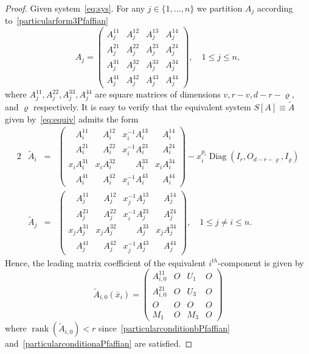 \documentclass[final,1p,times,number,amsthm]{elsart}
\begin{document}
\begin{proof}
  Given system~\eqref{eq:sys}. For any $j \in \{1, \dots, n\}$ we partition
  $A_{j}$ according to~\eqref{particularform3Pfaffian}
$$A_{j} = \left(\begin{matrix} A_{j}^{11}  & A_{j}^{12} & A_{j}^{13}&
    A_{j}^{14}\\[5pt] A_{j}^{21} & A_{j}^{22} & A_{j}^{23} & A_{j}^{24}\\[5pt]
    A_{j}^{31} & A_{j}^{32} & A_{j}^{33} & A_{j}^{34}\\[5pt] A_{j}^{41} &
    A_{j}^{42} & A_{j}^{43} & A_{j}^{44}\end{matrix}\right), \quad 1 \leq j \leq
n, $$
where $A_{j}^{11} , A_{j}^{22} , A_{j}^{33} , A_{j}^{44}$ are square matrices of
dimensions $v, r-v, d-r-\varrho,$ and $\varrho$ respectively.  It is easy to
verify that the equivalent system $S[A] \equiv {\tilde{A}}$ given
by~\eqref{eq:equiv} admits the form
\begin{alignat*}2
  & \tilde{A}_{i} &= &\left(\begin{matrix}\phantom{x_i} A_{i}^{11}
      & \phantom{x_i} A_{i}^{12} & x_{i}^{-1} A_{i}^{13} & \phantom{x_i}
      A_{i}^{14} \\[5pt] \phantom{x_i} A_{i}^{21} & \phantom{x_i} A_{i}^{22}&
      x_{i}^{-1} A_{i}^{23} & \phantom{x_i}A_{i}^{24} \\[5pt] x_{i} A_{i}^{31} &
      x_{i} A_{i}^{32}& \phantom{x_i^{-1}} A_{i}^{33}& x_{i} A_{i}^{34} \\[5pt]
      \phantom{x_i} A_{i}^{41} & \phantom{x_i} A_{i}^{42} & x_{i}^{-1}
      A_{i}^{43} & \phantom{x_i} A_{i}^{44} \end{matrix}\right) - x_{i}^{p_{i}}
  \operatorname{Diag} (I_{r}, O_{d-r-\varrho}, I_\varrho) \\[10pt] 
  & \tilde{A}_{j} &=& \left(\begin{matrix} \phantom{x_j} A_{j}^{11} & \phantom{x_j} A_{j}^{12} &
      x_{j}^{-1} A_{j}^{13} & \phantom{x_j} A_{j}^{14} \\[5pt] \phantom{x_j}
      A_{j}^{21} & \phantom{x_j} A_{j}^{22} & x_{i}^{-1} A_{j}^{23} &
      \phantom{x_j} A_{j}^{24} \\[5pt] x_{j} A_{j}^{31}
      & x_{j} A_{j}^{32} & \phantom{x_j^{-1}}A_{j}^{33} & x_{j} A_{j}^{34} \\[5pt]
      \phantom{x_j} A_{j}^{41} & \phantom{x_j} A_{j}^{42} & x_{j}^{-1}A_{j}^{43}
      & \phantom{x_j} A_{j}^{44} \end{matrix}\right) , \quad 1 \leq j \neq i
  \leq n.
\end{alignat*} 
Hence, the leading matrix coefficient of the equivalent
$i^{th}$-component is given by
$$ \tilde{A}_{i,0} (\bar{x}_{i}) = \left(\begin{matrix} A_{i,0}^{11}
    & O & U_1 & O \\[5pt] A_{i,0}^{21} & O & U_3 & O \\[5pt] O& O &O& O \\[5pt]
    M_1 & O & M_3 & O \end{matrix}\right) $$
where $\operatorname{rank}(\tilde{A}_{i,0}) < r$ since~\eqref{particularconditionbPfaffian}
and~\eqref{particularconditionaPfaffian} are satisfied.
\goodbreak


\end{proof}
\end{document}
